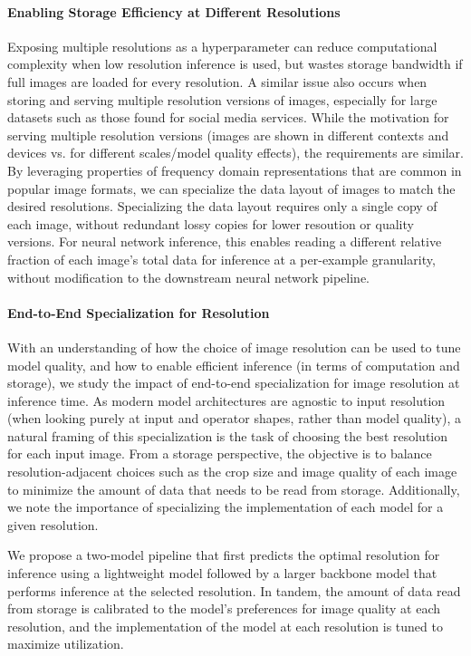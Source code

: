 \paragraph{Enabling Storage Efficiency at Different Resolutions}
Exposing multiple resolutions as a hyperparameter can reduce computational complexity when low resolution inference is used, but wastes storage bandwidth if full images are loaded for every resolution.
A similar issue also occurs when storing and serving multiple resolution versions of images, especially for large datasets such as those found for social media services.
While the motivation for serving multiple resolution versions (images are shown in different contexts and devices vs. for different scales/model quality effects), the requirements are similar.
By leveraging properties of frequency domain representations that are common in popular image formats, we can specialize the data layout of images to match the desired resolutions.
Specializing the data layout requires only a single copy of each image, without redundant lossy copies for lower resoution or quality versions.
For neural network inference, this enables reading a different relative fraction of each image's total data for inference at a per-example granularity, without modification to the downstream neural network pipeline.


\paragraph{End-to-End Specialization for Resolution}
With an understanding of how the choice of image resolution can be used to tune model quality, and how to enable efficient inference (in terms of computation and storage), we study the impact of end-to-end specialization for image resolution at inference time.
As modern model architectures are agnostic to input resolution (when looking purely at input and operator shapes, rather than model quality), a natural framing of this specialization is the task of choosing the best resolution for each input image.
From a storage perspective, the objective is to balance resolution-adjacent choices such as the crop size and image quality of each image to minimize the amount of data that needs to be read from storage.
Additionally, we note the importance of specializing the implementation of each model for a given resolution.

We propose a two-model pipeline that first predicts the optimal resolution for inference using a lightweight model followed by a larger backbone model that performs inference at the selected resolution.
In tandem, the amount of data read from storage is calibrated to the model's preferences for image quality at each resolution, and the implementation of the model at each resolution is tuned to maximize utilization.

